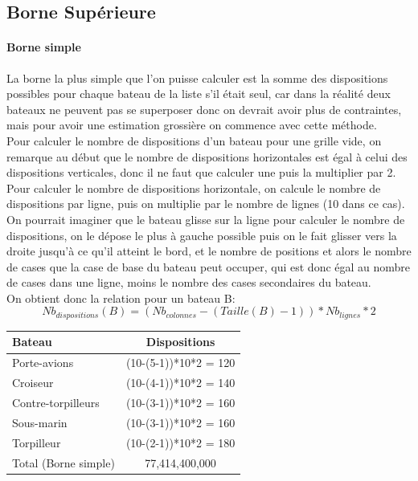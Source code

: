 \documentclass[12pt]{article}
\begin{document}
    \subsection{Borne Supérieure}
        \paragraph{Borne simple}
            La borne la plus simple que l'on puisse calculer est la somme des dispositions possibles pour chaque bateau de la liste s'il était seul, car dans la réalité deux bateaux ne peuvent pas se superposer donc on devrait avoir plus de contraintes, mais pour avoir une estimation grossière on commence avec cette méthode. \\
            Pour calculer le nombre de dispositions d'un bateau pour une grille vide, on remarque au début que le nombre de dispositions horizontales est égal à celui des dispositions verticales, donc il ne faut que calculer une puis la multiplier par 2. \\
            Pour calculer le nombre de dispositions horizontale, on calcule le nombre de dispositions par ligne, puis on multiplie par le nombre de lignes (10 dans ce cas).
            On pourrait imaginer que le bateau glisse sur la ligne pour calculer le nombre de dispositions, on le dépose le plus à gauche possible puis on le fait glisser vers la droite jusqu'à ce qu'il atteint le bord, et le nombre de positions et alors le nombre de cases que la case de base du bateau peut occuper, qui est donc égal au nombre de cases dans une ligne, moins le nombre des cases secondaires du bateau.\\
            On obtient donc la relation pour un bateau B: $$Nb_{dispositions}(B) = (Nb_{colonnes}-(Taille(B)-1))*Nb_{lignes}*2$$
            

            \begin{table}[!ht]
                \begin{tabular}{|l|c|}
                \hline
                Bateau               & Dispositions \\ \hline
                Porte-avions         & (10-(5-1))*10*2 = 120 \\ \hline
                Croiseur             & (10-(4-1))*10*2 = 140 \\ \hline
                Contre-torpilleurs   & (10-(3-1))*10*2 = 160 \\ \hline
                Sous-marin           & (10-(3-1))*10*2 = 160 \\ \hline
                Torpilleur           & (10-(2-1))*10*2 = 180 \\ \hline
                Total (Borne simple) & 77,414,400,000        \\ \hline
                \end{tabular}
                \end{table}
\end{document}
